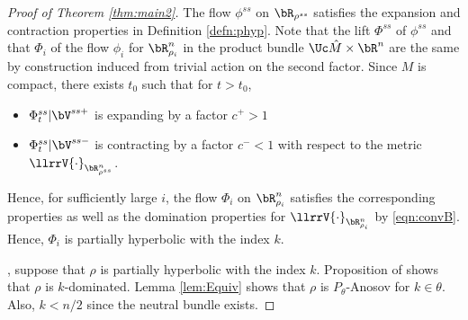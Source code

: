 \begin{proof}[Proof of Theorem  \ref{thm:main2}]
The flow $\phi^{ss}$ on $\bR_{\rho^{ss}}$ satisfies the expansion and contraction properties
in Definition \ref{defn:phyp}. 
Note that the lift $\Phi^{ss}$ of $\phi^{ss}$ and that $\Phi_i$ of the flow $\phi_i$ for $\bR^n_{\rho_i}$ in the product bundle 
$\Uc \hat M \times \bR^n$ are the same by construction
induced from trivial action on the second factor. 
Since $M$ is compact, there exists $t_0$ such that for $t> t_0$, 
\begin{itemize} 
\item $\Phi^{ss}_{t}| \bV^{ss+} $  is expanding by a factor $c^+> 1$ 
\item $\Phi^{ss}_{t}| \bV^{ss-}$ is contracting by a factor $c^- < 1$  with respect to 
the metric $\llrrV{\cdot}_{\bR^n_{\rho^{ss}}}$. 
\end{itemize} 
Hence, for sufficiently large $i$, 
the flow $\Phi_i$ on $\bR^n_{\rho_i}$  satisfies the corresponding properties
as well as the domination properties for $\llrrV{\cdot}_{\bR^n_{\rho_i}}$ 
by \eqref{eqn:convB}. 
Hence, $\Phi_i$ is partially hyperbolic with the index $k$.  
		
		
, suppose that $\rho$ is partially hyperbolic with the index $k$. 
Proposition  of \cite{BPS} shows that $\rho$ is $k$-dominated. 
Lemma \ref{lem:Equiv}  shows that $\rho$ is $P_\theta$-Anosov for $k \in \theta$. 
Also, $k < n/2$ since the neutral bundle exists. 
\end{proof} 


